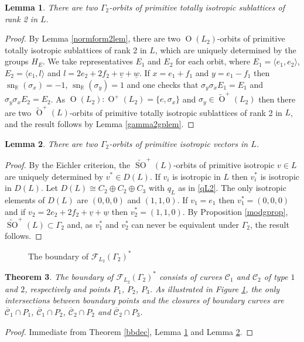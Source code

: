 \documentclass[11pt]{article}
\newtheorem{thm}{Theorem}[section]
\newtheorem{lem}[thm]{Lemma}
\newcommand{\RR}{\mathbb{R}}
\newcommand{\cc}{\mathcal{C}}
\newcommand{\fc}{\mathcal{F}}
\newcommand{\la}{\langle}
\newcommand{\ra}{\rangle}
\newcommand{\opn}{\operatorname}
\newcommand{\op}{\oplus}
\begin{document}
\begin{lem}\label{L2planeslem}
  There are two $\Gamma_2$-orbits of primitive totally isotropic sublattices of rank 2 in $L$.
\end{lem}
\begin{proof}
  By Lemma \ref{normform2lem}, there are two $\opn{O}(L_2)$-orbits of primitive totally isotropic sublattices of rank 2 in $L$, which are uniquely determined by the groups $H_E$.
  We take representatives $E_1$ and $E_2$ for each orbit, where
  $E_1 = \la e_1, e_2 \ra$, $E_2 = \la e_1, l \ra$ and  $l=2e_2 + 2f_2 + \underline{v} + \underline{w}$.
  If $x=e_1 + f_1$ and $y = e_1 - f_1$ then
  $\opn{sn}_{\RR}(\sigma_x) = -1$,
  $\opn{sn}_{\RR}(\sigma_y) = 1$ and
  one checks that
  $\sigma_y \sigma_x E_1 = E_1$
  and
  $\sigma_y \sigma_x E_2 = E_2$.
  As $\opn{O}(L_2): \opn{O}^+(L_2) = \{e,  \sigma_x\}$ and $\sigma_y \in \widetilde{\opn{O}}^+(L_2)$ then there are two $\widetilde{\opn{O}}^+(L)$-orbits of primitive totally isotropic sublattices of rank 2 in $L$, and the result follows by Lemma \ref{gamma2gplem}.
\end{proof}
\begin{lem}\label{L2lineslem}
  There are two $\Gamma_2$-orbits of primitive isotropic vectors in $L$.
\end{lem}
\begin{proof}
  By the Eichler criterion,  the $\widetilde{\opn{SO}}^+(L)$-orbits of primitive isotropic $v \in L$ are uniquely determined by $v^* \in D(L)$.
  If $v_i$ is isotropic in $L$ then $v_i^*$ is isotropic in $D(L)$.
  Let $D(L) \cong C_2 \op C_2 \op C_3$ with $q_{L}$ as in \eqref{qL2}.
  The only isotropic elements of $D(L)$ are $(0,0,0)$ and $(1,1,0)$.
  If $v_1 = e_1$ then $v_1^* = (0,0,0)$ and
  if $v_2 = 2e_2 + 2f_2 + \underline{v} + \underline{w} $ then $v_2^* = (1,1,0)$.
  By Proposition \ref{modgprop}, $\widetilde{\opn{SO}}^+(L) \subset \Gamma_2$ and, as $v_1^*$ and $v_2^*$ can never be equivalent under $\Gamma_2$, the result follows.
\end{proof}
\begin{figure}
  \centering
  \caption{The boundary of $\fc_{L_2}(\Gamma_2)^*$}\label{boundary}
\end{figure}
\begin{thm}\label{L2boundarythm}
The boundary of $\fc_{L_2}(\Gamma_2)^*$ consists of curves $\cc_1$ and $\cc_2$ of type $1$ and $2$, respectively and points $P_1$, $P_2$, $P_3$.
  As illustrated in Figure \ref{boundary}, the only intersections between boundary points and the closures of boundary curves are $\overline{\cc}_1 \cap P_1$, $\overline{\cc}_1 \cap P_2$, $\overline{\cc}_2 \cap P_2$ and $\overline{\cc}_2 \cap P_3$.
\end{thm}
\begin{proof}
  Immediate from Theorem \ref{bbdec}, Lemma \ref{L2planeslem} and Lemma \ref{L2lineslem}.
\end{proof}
\end{document}
